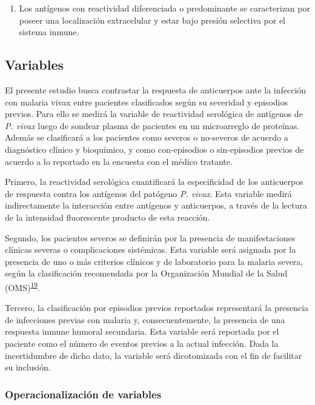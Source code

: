 \documentclass[]{article}
\providecommand{\tightlist}{%
  \setlength{\itemsep}{0pt}\setlength{\parskip}{0pt}}
\begin{document}
\begin{enumerate}
\def\labelenumi{\arabic{enumi}.}
\setcounter{enumi}{2}
\tightlist
\item
  Los antígenos con reactividad diferenciada o predominante se
  caracterizan por poseer una localización extracelular y estar bajo
  presión selectiva por el sistema inmune.
\end{enumerate}

\subsection{Variables}\label{variables}

El presente estudio busca contrastar la respuesta de anticuerpos ante la
infección con malaria vivax entre pacientes clasificados según su
severidad y episodios previos. Para ello se medirá la variable de
reactividad serológica de antígenos de \emph{P. vivax} luego de sondear
plasma de pacientes en un microarreglo de proteínas. Además se
clasificará a los pacientes como severos o no-severos de acuerdo a
diagnóstico clínico y bioquímico, y como con-episodios o sin-episodios
previos de acuerdo a lo reportado en la encuesta con el médico tratante.

Primero, la reactividad serológica cuantificará la especificidad de los
anticuerpos de respuesta contra los antígenos del patógeno \emph{P.
vivax}. Esta variable medirá indirectamente la interacción entre
antígenos y anticuerpos, a través de la lectura de la intensidad
fluorescente producto de esta reacción.

Segundo, los pacientes severos se definirán por la presencia de
manifestaciones clínicas severas o complicaciones sistémicas. Esta
variable será asignada por la presencia de uno o más criterios clínicos
y de laboratorio para la malaria severa, según la clasificación
recomendada por la Organización Mundial de la Salud
(OMS)\textsuperscript{\protect\hyperlink{ref-WHO2014severe}{19}}.

Tercero, la clasificación por episodios previos reportados representará
la presencia de infecciones previas con malaria y, consecuentemente, la
presencia de una respuesta inmune humoral secundaria. Esta variable será
reportada por el paciente como el número de eventos previos a la actual
infección. Dada la incertidumbre de dicho dato, la variable será
dicotomizada con el fin de facilitar su inclusión.

\subsubsection{Operacionalización de
variables}\label{operacionalizacion-de-variables}
\end{document}
